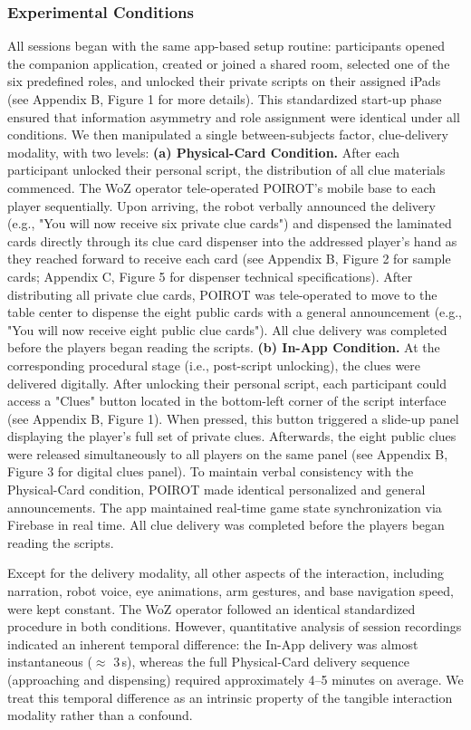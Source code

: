 \documentclass[sigconf,screen]{acmart-tagged}
\newcommand{\rev}[1]{#1}
\begin{document}
\subsubsection{Experimental Conditions}
All sessions began with the same app-based setup routine: participants opened the companion application, created or joined a shared room, selected one of the six predefined roles, and unlocked their private scripts on their assigned iPads (see Appendix B, Figure 1 for more details). This standardized start-up phase ensured that information asymmetry and role assignment were identical under all conditions. We then manipulated a single between-subjects factor, clue-delivery modality, with two levels: \textbf{(a) Physical-Card Condition.} After each participant unlocked their personal script, the distribution of all clue materials commenced. The WoZ operator tele-operated POIROT's mobile base to each player sequentially. Upon arriving, the robot verbally announced the delivery (e.g., "You will now receive six private clue cards") and dispensed the laminated cards directly through its clue card dispenser into the addressed player's hand as they reached forward to receive each card (see Appendix B, Figure 2 for sample cards; Appendix C, Figure 5 for dispenser technical specifications). After distributing all private clue cards, POIROT was tele-operated to move to the table center to dispense the eight public cards with a general announcement (e.g., "You will now receive eight public clue cards"). All clue delivery was completed before the players began reading the scripts. \textbf{(b) In-App Condition.} At the corresponding procedural stage (i.e., post-script unlocking), the clues were delivered digitally. After unlocking their personal script, each participant could access a "Clues" button located in the bottom-left corner of the script interface (see Appendix B, Figure 1). When pressed, this button triggered a slide-up panel displaying the player's full set of private clues. Afterwards, the eight public clues were released simultaneously to all players on the same panel (see Appendix B, Figure 3 for digital clues panel). To maintain verbal consistency with the Physical-Card condition, POIROT made identical personalized and general announcements. The app maintained real-time game state synchronization via Firebase \cite{firebase} in real time. All clue delivery was completed before the players began reading the scripts.

\rev{Except for the delivery modality, all other aspects of the interaction, including narration, robot voice, eye animations, arm gestures, and base navigation speed, were kept constant. The WoZ operator followed an identical standardized procedure in both conditions. However, quantitative analysis of session recordings indicated an inherent temporal difference: the In-App delivery was almost instantaneous ($\approx$ 3\,s), whereas the full Physical-Card delivery sequence (approaching and dispensing) required approximately 4--5 minutes on average. We treat this temporal difference as an intrinsic property of the tangible interaction modality rather than a confound.}
\end{document}
